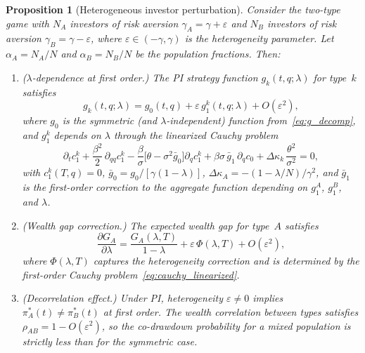 \documentclass[12pt]{article}
\newtheorem{proposition}[theorem]{Proposition}
\theoremstyle{remark}
\theoremstyle{definition}
\begin{document}
\begin{proposition}[Heterogeneous investor perturbation]
\label{prop:heterogeneous}
Consider the two-type game with $N_A$ investors of risk aversion
$\gamma_A = \gamma + \varepsilon$ and $N_B$ investors of risk aversion
$\gamma_B = \gamma - \varepsilon$, where $\varepsilon \in (-\gamma, \gamma)$
is the heterogeneity parameter.
Let $\alpha_A = N_A/N$ and $\alpha_B = N_B/N$ be the population
fractions.
Then:

\begin{enumerate}[label=(\roman*)]
\item ($\lambda$-dependence at first order.)
  The PI strategy function $g_k(t,q;\lambda)$ for type~$k$ satisfies
  \begin{equation}\label{eq:g_hetero}
    g_k(t,q;\lambda) = g_0(t,q) + \varepsilon\,g_1^k(t,q;\lambda)
      + O(\varepsilon^2),
  \end{equation}
  where $g_0$ is the symmetric (and $\lambda$-independent) function
  from~\eqref{eq:g_decomp}, and $g_1^k$ depends on $\lambda$ through
  the linearized Cauchy problem
  \begin{equation}\label{eq:cauchy_linearized}
    \partial_t c_1^k + \frac{\beta^2}{2}\,\partial_{qq} c_1^k
    - \frac{\beta}{\sigma}\bigl[\theta - \sigma^2 \bar{g}_0\bigr]
      \partial_q c_1^k
    + \beta\sigma\,\bar{g}_1\,\partial_q c_0
    + \Delta\kappa_k\,\frac{\theta^2}{\sigma^2} = 0,
  \end{equation}
  with $c_1^k(T,q) = 0$,
  $\bar{g}_0 = g_0/[\gamma(1-\lambda)]$,
  $\Delta\kappa_A = -(1-\lambda/N)/\gamma^2$, and $\bar{g}_1$ is the
  first-order correction to the aggregate function depending on
  $g_1^A$, $g_1^B$, and $\lambda$.

\item (Wealth gap correction.)
  The expected wealth gap for type~$A$ satisfies
  \begin{equation}\label{eq:gap_hetero}
    \frac{\partial G_A}{\partial\lambda}
    = \frac{G_A(\lambda, T)}{1-\lambda}
    + \varepsilon\,\Phi(\lambda, T) + O(\varepsilon^2),
  \end{equation}
  where $\Phi(\lambda, T)$ captures the heterogeneity correction and
  is determined by the first-order Cauchy problem~\eqref{eq:cauchy_linearized}.

\item (Decorrelation effect.)
  Under PI, heterogeneity $\varepsilon \neq 0$ implies
  $\pi_A^*(t) \neq \pi_B^*(t)$ at first order.
  The wealth correlation between types satisfies
  $\rho_{AB} = 1 - O(\varepsilon^2)$, so the co-drawdown probability
  for a mixed population is strictly less than for the symmetric case.
\end{enumerate}
\end{proposition}
\end{document}
